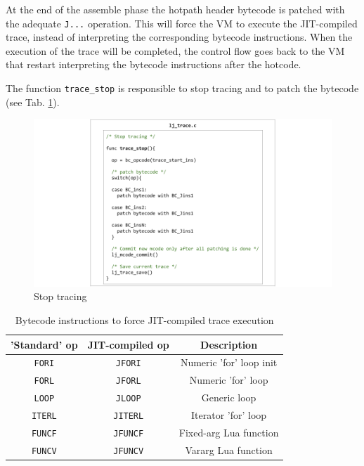 \noindent
At the end of the assemble phase the hotpath header bytecode is patched with the adequate \texttt{J...} operation. This will force the VM to execute the JIT-compiled trace, instead of interpreting the corresponding bytecode instructions. When the execution of the trace will be completed, the control flow goes back to the VM that restart interpreting the bytecode instructions after the hotcode.

The function \texttt{trace\_stop} is responsible to stop tracing and to patch the bytecode (see Tab. \ref{tab:jitcompiled-operations}).

\begin{figure}[H]
    \centering
	\includegraphics[width=\textwidth]{images/chapter7/Trace_Stop.png}
    \caption{Stop tracing}
    \label{fig:stop-tracing}
\end{figure}

\begin{table}[H]
    \centering
    \begin{tabular}{|c|c|c|}
        \hline
        'Standard' op & JIT-compiled op & Description \\
        \hline
        \texttt{FORI} & \texttt{JFORI} & Numeric 'for' loop init\\
        \texttt{FORL} & \texttt{JFORL} & Numeric 'for' loop\\
        \texttt{LOOP} &  \texttt{JLOOP} & Generic loop\\
        \texttt{ITERL} & \texttt{JITERL} & Iterator 'for' loop\\
        \texttt{FUNCF} & \texttt{JFUNCF} & Fixed-arg Lua function\\
        \texttt{FUNCV} & \texttt{JFUNCV} & Vararg Lua function\\
        \hline
    \end{tabular}
    \caption{Bytecode instructions to force JIT-compiled trace execution}
    \label{tab:jitcompiled-operations}
\end{table}

